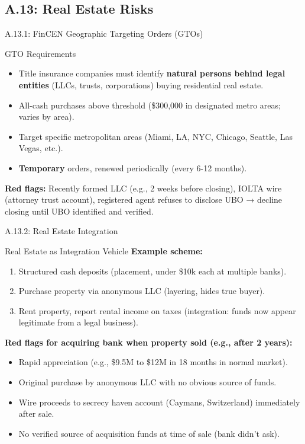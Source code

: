 \documentclass{beamer}
\begin{document}
	\subsection{A.13: Real Estate Risks}
	
	\begin{frame}{A.13.1: FinCEN Geographic Targeting Orders (GTOs)}
		\begin{block}{GTO Requirements}
			\begin{itemize}
				\item Title insurance companies must identify \textbf{natural persons behind legal entities} (LLCs, trusts, corporations) buying residential real estate.
				\item All-cash purchases above threshold (\$300,000 in designated metro areas; varies by area).
				\item Target specific metropolitan areas (Miami, LA, NYC, Chicago, Seattle, Las Vegas, etc.).
				\item \textbf{Temporary} orders, renewed periodically (every 6-12 months).
			\end{itemize}
		\end{block}
		\textbf{Red flags:} Recently formed LLC (e.g., 2 weeks before closing), IOLTA wire (attorney trust account), registered agent refuses to disclose UBO → decline closing until UBO identified and verified.
	\end{frame}
	
	\begin{frame}{A.13.2: Real Estate Integration}
		\begin{block}{Real Estate as Integration Vehicle}
			\textbf{Example scheme:}
			\begin{enumerate}
				\item Structured cash deposits (placement, under \$10k each at multiple banks).
				\item Purchase property via anonymous LLC (layering, hides true buyer).
				\item Rent property, report rental income on taxes (integration: funds now appear legitimate from a legal business).
			\end{enumerate}
		\end{block}
		\textbf{Red flags for acquiring bank when property sold (e.g., after 2 years):}
		\begin{itemize}
			\item Rapid appreciation (e.g., \$9.5M to \$12M in 18 months in normal market).
			\item Original purchase by anonymous LLC with no obvious source of funds.
			\item Wire proceeds to secrecy haven account (Caymans, Switzerland) immediately after sale.
			\item No verified source of acquisition funds at time of sale (bank didn't ask).
		\end{itemize}
	\end{frame}
	
\end{document}
